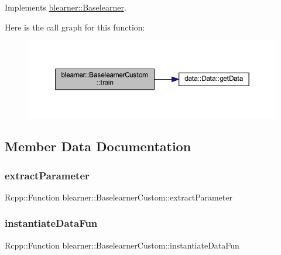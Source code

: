 Implements \mbox{\hyperlink{classblearner_1_1_baselearner_a40e03ad070b9a03aae706d9ee8094b80}{blearner\+::\+Baselearner}}.

Here is the call graph for this function\+:\nopagebreak
\begin{figure}[H]
\begin{center}
\leavevmode
\includegraphics[width=350pt]{classblearner_1_1_baselearner_custom_a31e3921f86f267d36135d07bf1d16551_cgraph}
\end{center}
\end{figure}


\subsection{Member Data Documentation}
\mbox{\label{classblearner_1_1_baselearner_custom_a4b88f7464f9c686a35d40f438119ea40}} 
\subsubsection{\texorpdfstring{extract\+Parameter}{extractParameter}}
{\footnotesize\ttfamily Rcpp\+::\+Function blearner\+::\+Baselearner\+Custom\+::extract\+Parameter\hspace{0.3cm}{\ttfamily [private]}}

\mbox{\label{classblearner_1_1_baselearner_custom_a6372076461467dc41f7af4ee198a91c6}} 
\subsubsection{\texorpdfstring{instantiate\+Data\+Fun}{instantiateDataFun}}
{\footnotesize\ttfamily Rcpp\+::\+Function blearner\+::\+Baselearner\+Custom\+::instantiate\+Data\+Fun\hspace{0.3cm}{\ttfamily [private]}}

